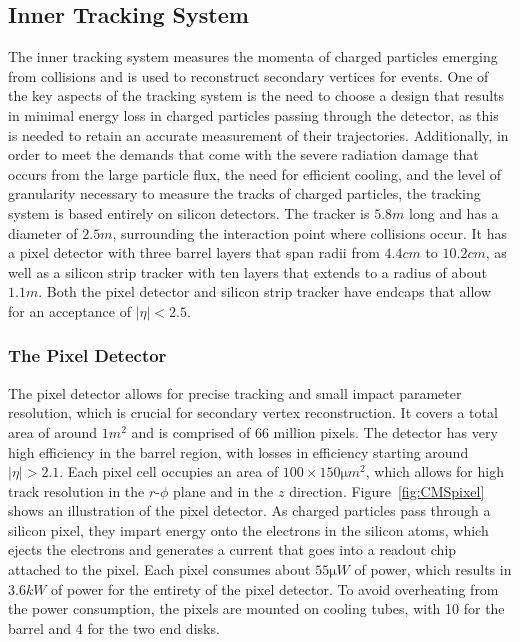 \subsection{Inner Tracking System}
\label{subsec:tracking}

The inner tracking system measures the momenta of charged particles emerging from collisions and is used to reconstruct secondary vertices for events.
One of the key aspects of the tracking system is the need to choose a design that results in minimal energy loss in charged particles passing through the detector, as this is needed to retain an accurate measurement of their trajectories.
Additionally, in order to meet the demands that come with the severe radiation damage that occurs from the large particle flux, the need for efficient cooling, and the level of granularity necessary to measure the tracks of charged particles, the tracking system is based entirely on silicon detectors.
The tracker is $5.8\unit{m}$ long and has a diameter of $2.5\unit{m}$, surrounding the interaction point where collisions occur.
It has a pixel detector with three barrel layers that span radii from $4.4\unit{cm}$ to $10.2\unit{cm}$, as well as a silicon strip tracker with ten layers that extends to a radius of about $1.1\unit{m}$.
Both the pixel detector and silicon strip tracker have endcaps that allow for an acceptance of $|\eta|<2.5$.

\subsubsection{The Pixel Detector}

The pixel detector allows for precise tracking and small impact parameter resolution, which is crucial for secondary vertex reconstruction.
It covers a total area of around $1\unit{m^2}$ and is comprised of 66 million pixels.
The detector has very high efficiency in the barrel region, with losses in efficiency starting around $|\eta|>2.1$.
Each pixel cell occupies an area of $100\times150\unit{\micro m^2}$, which allows for high track resolution in the $r$-$\phi$ plane and in the $z$ direction.
Figure~\ref{fig:CMSpixel} shows an illustration of the pixel detector.
As charged particles pass through a silicon pixel, they impart energy onto the electrons in the silicon atoms, which ejects the electrons and generates a current that goes into a readout chip attached to the pixel.
Each pixel consumes about $55\unit{\micro W}$ of power, which results in $3.6\unit{kW}$ of power for the entirety of the pixel detector.
To avoid overheating from the power consumption, the pixels are mounted on cooling tubes, with 10 for the barrel and 4 for the two end disks.

